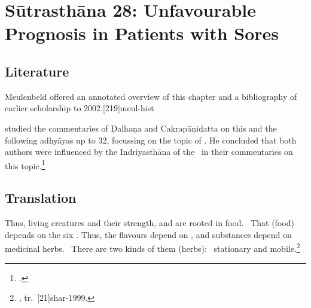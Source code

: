 \chapter{Sūtrasthāna 28: Unfavourable Prognosis in Patients with Sores}

\section{Literature}

Meulenbeld offered an annotated overview of this chapter and a bibliography
of earlier scholarship to 2002.[219]{meul-hist} 

\citeauthor{gosw-2011} studied the commentaries of Ḍalhaṇa and 
Cakrapāṇidatta on this and the following adhyāyas up to 32, focussing on the 
topic of .  He concluded that both 
authors were influenced by the Indriyasthāna of the \CS\ in their commentaries 
on this topic.\footcite{gosw-2011}

\section{Translation}
    
\begin{translation}    
    \item [1] Thus, living creatures and their strength,
 and  are rooted in food.  That
(food) depends on the six . Thus, the flavours depend
on , and substances depend on medicinal herbs. 
There are two kinds of them (herbs):  stationary and 
mobile.\footnote{, tr.\ [21]{shar-1999}.}

\end{translation}
